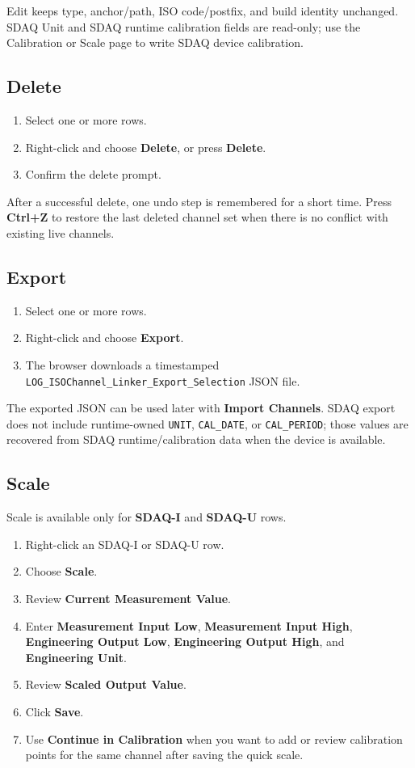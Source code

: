 \documentclass[11pt,a4paper]{article}
\begin{document}
Edit keeps type, anchor/path, ISO code/postfix, and build identity unchanged. SDAQ Unit and SDAQ runtime calibration fields are read-only; use the Calibration or Scale page to write SDAQ device calibration.

\subsection{Delete}
\begin{enumerate}
\item Select one or more rows.
\item Right-click and choose \textbf{Delete}, or press \textbf{Delete}.
\item Confirm the delete prompt.
\end{enumerate}

After a successful delete, one undo step is remembered for a short time. Press \textbf{Ctrl+Z} to restore the last deleted channel set when there is no conflict with existing live channels.

\subsection{Export}
\begin{enumerate}
\item Select one or more rows.
\item Right-click and choose \textbf{Export}.
\item The browser downloads a timestamped \texttt{LOG\_ISOChannel\_Linker\_Export\_Selection} JSON file.
\end{enumerate}

The exported JSON can be used later with \textbf{Import Channels}. SDAQ export does not include runtime-owned \texttt{UNIT}, \texttt{CAL\_DATE}, or \texttt{CAL\_PERIOD}; those values are recovered from SDAQ runtime/calibration data when the device is available.

\subsection{Scale}
Scale is available only for \textbf{SDAQ-I} and \textbf{SDAQ-U} rows.

\begin{enumerate}
\item Right-click an SDAQ-I or SDAQ-U row.
\item Choose \textbf{Scale}.
\item Review \textbf{Current Measurement Value}.
\item Enter \textbf{Measurement Input Low}, \textbf{Measurement Input High}, \textbf{Engineering Output Low}, \textbf{Engineering Output High}, and \textbf{Engineering Unit}.
\item Review \textbf{Scaled Output Value}.
\item Click \textbf{Save}.
\item Use \textbf{Continue in Calibration} when you want to add or review calibration points for the same channel after saving the quick scale.
\end{enumerate}
\end{document}
